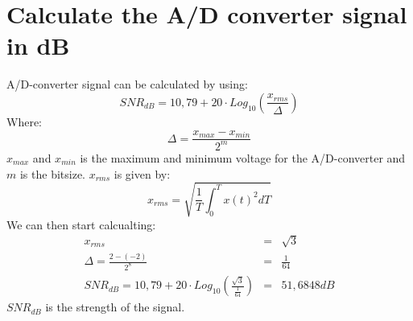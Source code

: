 \documentclass[a4wide,10pt]{article}
\begin{document}
\section{Calculate the A/D converter signal in dB} %
\label{sec:calculate_the_a_d_converter_signal_in_db}
A/D-converter signal can be calculated by using:
\begin{equation}
	SNR_{dB} = 10,79 + 20 \cdot Log_{10}(\frac{x_{rms}}{\Delta})
\end{equation}
Where:
\begin{equation}
	\Delta = \frac{x_{max} - x_{min}}{2^m}
\end{equation}
$x_{max}$ and $x_{min}$ is the maximum and minimum voltage for the A/D-converter and $m$ is the bitsize.
$x_{rms}$ is given by:
\begin{equation}
	x_{rms} = \sqrt{\frac{1}{T}\int_0^T x(t)^2 dT}
\end{equation}
We can then start calcualting:
\begin{eqnarray}
	x_{rms} &=& \sqrt{3} \nonumber \\
	\Delta = \frac{2 - (-2)}{2^8} &=& \frac{1}{64} \nonumber \\
	SNR_{dB} = 10,79 + 20 \cdot Log_{10}(\frac{\sqrt{3}}{\frac{1}{64}}) &=& 51,6848dB \nonumber
\end{eqnarray}
$SNR_{dB}$ is the strength of the signal.
\end{document}
